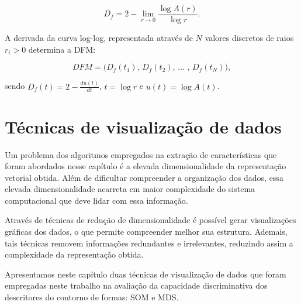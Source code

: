 \begin{equation}
D_f = 2 - \lim_{r \to 0}  \frac{\log{A(r)}}{\log{r}}.
\label{eq:df}
\end{equation}

A derivada da curva log-log, representada através de $N$ valores discretos de raios $r_i>0$ determina a \ac{DFM}:

\begin{equation}
DFM = \big(D_f(t_1)\text{, }D_f(t_2)\text{, }\ldots\text{ , }D_f(t_N)\big), 
\label{eq:dfm}
\end{equation}

\noindent sendo  $D_f(t) = 2 - \frac{du(t)}{dt}$, $t = \log{r}$ e $u(t) = \log{A(t)}$.


\section{Técnicas de visualização de dados}

Um problema dos algoritmos empregados na extração de características que foram abordados nesse capítulo é a elevada dimensionalidade da representação vetorial obtida. Além de dificultar compreender a organização dos dados, essa elevada dimensionalidade acarreta em maior complexidade do sistema computacional que deve lidar com essa informação. 

Através de técnicas de redução de dimensionalidade é possível gerar visualizações gráficas dos dados, o que permite compreender melhor sua estrutura. Ademais, tais técnicas removem informações redundantes e irrelevantes, reduzindo assim a complexidade da representação obtida.

Apresentamos neste capítulo duas técnicas de visualização de dados que foram empregadas neste trabalho na avaliação da capacidade discriminativa dos descritores do contorno de formas: \acf{SOM} e \acf{MDS}.



